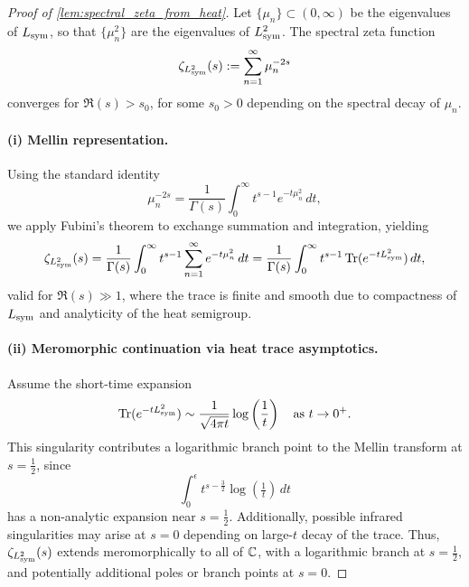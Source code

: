 \begin{proof}[Proof of \cref{lem:spectral_zeta_from_heat}]
Let \( \{ \mu_n \} \subset (0, \infty) \) be the eigenvalues of \( L_{\mathrm{sym}} \), so that \( \{ \mu_n^2 \} \) are the eigenvalues of \( L_{\mathrm{sym}}^2 \). The spectral zeta function
\[
\zeta_{L_{\mathrm{sym}}^2}(s) := \sum_{n=1}^\infty \mu_n^{-2s}
\]
converges for \( \Re(s) > s_0 \), for some \( s_0 > 0 \) depending on the spectral decay of \( \mu_n \).

\paragraph{(i) Mellin representation.}
Using the standard identity
\[
\mu_n^{-2s} = \frac{1}{\Gamma(s)} \int_0^\infty t^{s-1} e^{-t \mu_n^2} \, dt,
\]
we apply Fubini’s theorem to exchange summation and integration, yielding
\[
\zeta_{L_{\mathrm{sym}}^2}(s)
= \frac{1}{\Gamma(s)} \int_0^\infty t^{s-1} \sum_{n=1}^\infty e^{-t \mu_n^2} \, dt
= \frac{1}{\Gamma(s)} \int_0^\infty t^{s-1} \operatorname{Tr}(e^{-t L_{\mathrm{sym}}^2}) \, dt,
\]
valid for \( \Re(s) \gg 1 \), where the trace is finite and smooth due to compactness of \( L_{\mathrm{sym}} \) and analyticity of the heat semigroup.

\paragraph{(ii) Meromorphic continuation via heat trace asymptotics.}
Assume the short-time expansion
\[
\operatorname{Tr}(e^{-t L_{\mathrm{sym}}^2}) \sim \frac{1}{\sqrt{4\pi t}} \log\left( \frac{1}{t} \right)
\quad \text{as } t \to 0^+.
\]
This singularity contributes a logarithmic branch point to the Mellin transform at \( s = \tfrac{1}{2} \), since
\[
\int_0^\epsilon t^{s - \frac{3}{2}} \log\left( \tfrac{1}{t} \right) \, dt
\]
has a non-analytic expansion near \( s = \tfrac{1}{2} \). Additionally, possible infrared singularities may arise at \( s = 0 \) depending on large-\(t\) decay of the trace. Thus, \( \zeta_{L_{\mathrm{sym}}^2}(s) \) extends meromorphically to all of \( \mathbb{C} \), with a logarithmic branch at \( s = \tfrac{1}{2} \), and potentially additional poles or branch points at \( s = 0 \).

\end{proof}
